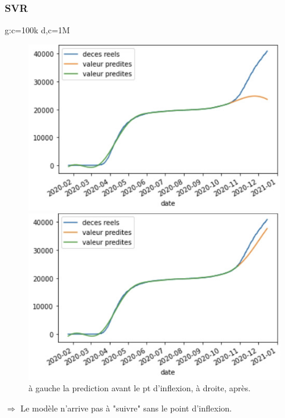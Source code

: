 \documentclass{beamer}
\begin{document}
\begin{frame}
	\frametitle{SVR}
	g:c=100k
	d,c=1M
	\begin{figure}[t]
		\centering
		\begin{minipage}{0.4\textwidth}
			\includegraphics[scale=0.25]{SVR_avant_pt_dinflexion}
		\end{minipage}
		\begin{minipage}{0.4\textwidth}
			\includegraphics[scale=0.25]{SVR_apres_pt_dinflexion}
		\end{minipage}
	\caption{à gauche la prediction avant le pt d'inflexion, à droite, après.}
	\end{figure}
	$\Rightarrow$ Le modèle n'arrive pas à "suivre" sans le point d'inflexion.
\end{frame}
\end{document}
